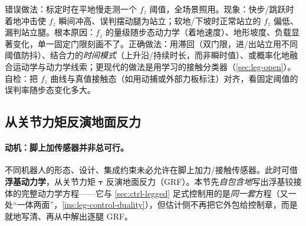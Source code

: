\begin{pitfall}
错误做法：标定时在平地慢走测一个 $f_z$ 阈值，全场景照用。现象：快步/跳跃时着地冲击使 $f_z$ 瞬间冲高、误判摆动腿为站立；软地/下坡时正常站立的 $f_z$ 偏低、漏判站立腿。根本原因：$f_z$ 的量级随步态动力学（着地速度）、地形坡度、负载显著变化，单一固定门限刻画不了。正确做法：用滞回（双门限，进/出站立用不同阈值防抖）、结合力的\emph{时间模式}（上升沿/持续时长，而非瞬时值）、或概率化地融合运动学与动力学线索\cite{carlone2026handbook}；更现代的做法是用学习的接触分类器（\cref{sec:leg-open}）。自检：把 $f_z$ 曲线与真值接触态（如用动捕或外部力板标注）对齐，看固定阈值的误判率随步态变化多大。
\end{pitfall}

\subsection{从关节力矩反演地面反力}
\label{subsec:leg-grf}

\paragraph{动机：脚上加传感器并非总可行。}
不同机器人的形态、设计、集成约束未必允许在脚上加力/接触传感器。此时可借\textbf{浮基动力学}，从关节力矩 $\boldsymbol{\tau}$ 反演地面反力（GRF）。本节先\emph{自包含地}写出浮基铰接体的完整动力学方程——它与 \cref{sec:ctrl-legged} 足式控制用的是\emph{同一套}方程（又一处“一体两面”，\cref{ins:leg-control-duality}），但估计侧不再把它外包给控制章，而是就地写清、再从中解出逐腿 GRF。

